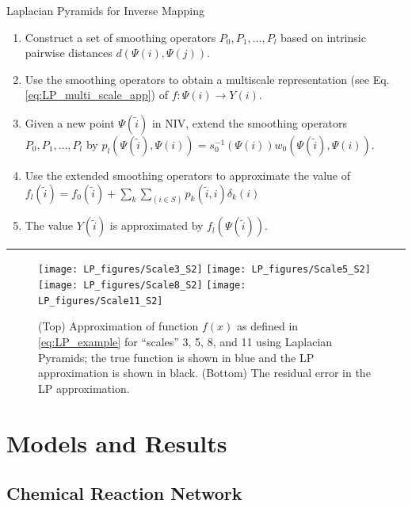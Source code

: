 \documentclass[aip,jcp,preprint]{revtex4-1}
\begin{document}
\begin{algorithm}[th!]
\caption{Laplacian Pyramids for Inverse Mapping}
\begin{enumerate}

\item
Construct a set of smoothing operators $P_0, P_1, \ldots, P_l$  based on intrinsic pairwise distances $d(\Psi(i),\Psi(j))$.

\item
Use the smoothing operators to obtain a multiscale representation (see Eq. \ref{eq:LP_multi_scale_app}) of $f:\Psi(i) \rightarrow Y(i)$.

\item Given a new point $\Psi(\tilde{i})$ in NIV, extend the smoothing operators $P_0, P_1, \ldots, P_l$  by
$p_l(\Psi(\tilde{i}), \Psi(i)) = s_0^{-1}(\Psi(i))w_0(\Psi(\tilde{i}),\Psi(i))$.

\item
Use the extended smoothing operators to approximate the value of $f_l(\tilde{i}) = f_0(\tilde{i}) + \sum_{k}\sum_{(i \in S)}p_k(\tilde{i}, i)\delta_k(i)$

\item
The value $Y(\tilde{i})$ is approximated by $f_l(\Psi(\tilde{i}))$.

\end{enumerate}
\hrule
\label{algo_LP}
\end{algorithm}


\begin{figure}[ht]
\texttt{[image: LP\_figures/Scale3\_S2]}
\texttt{[image: LP\_figures/Scale5\_S2]}
\texttt{[image: LP\_figures/Scale8\_S2]}
\texttt{[image: LP\_figures/Scale11\_S2]}
\caption{(Top) Approximation of function $f(x)$ as defined in \eqref{eq:LP_example} for ``scales'' 3, 5, 8, and 11 using Laplacian Pyramids; the true function is shown in blue and the LP approximation is shown in black. (Bottom) The residual error in the LP approximation.}
\label{fig:LP_ex}
\end{figure}

\section{Models and Results} \label{sec:examples}

\subsection{Chemical Reaction Network}\label{subsec:rxn_network}
\end{document}
